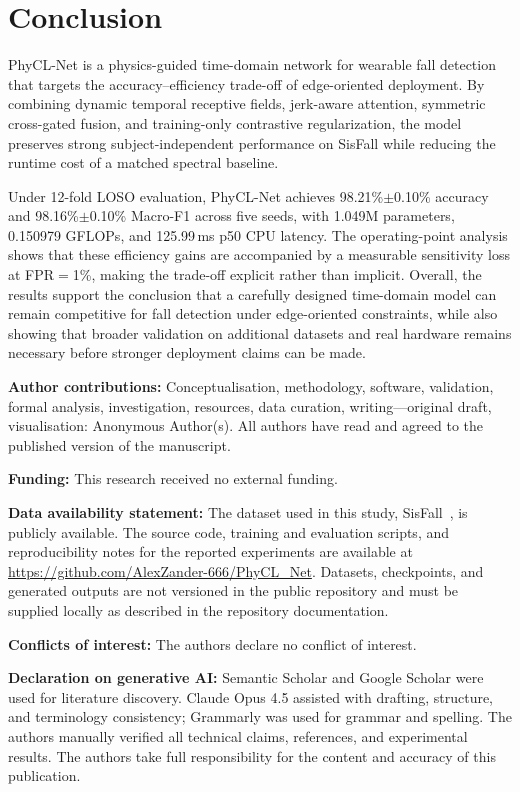 \documentclass[jec]{acnsart}
\begin{document}
\section{Conclusion}

PhyCL-Net is a physics-guided time-domain network for wearable fall detection that targets the accuracy--efficiency trade-off of edge-oriented deployment. By combining dynamic temporal receptive fields, jerk-aware attention, symmetric cross-gated fusion, and training-only contrastive regularization, the model preserves strong subject-independent performance on SisFall while reducing the runtime cost of a matched spectral baseline.

Under 12-fold LOSO evaluation, PhyCL-Net achieves 98.21\%$\pm$0.10\% accuracy and 98.16\%$\pm$0.10\% Macro-F1 across five seeds, with 1.049M parameters, 0.150979 GFLOPs, and 125.99\,ms p50 CPU latency. The operating-point analysis shows that these efficiency gains are accompanied by a measurable sensitivity loss at FPR${=}$1\%, making the trade-off explicit rather than implicit. Overall, the results support the conclusion that a carefully designed time-domain model can remain competitive for fall detection under edge-oriented constraints, while also showing that broader validation on additional datasets and real hardware remains necessary before stronger deployment claims can be made.

\vspace{1em}
\noindent\textbf{Author contributions:} Conceptualisation, methodology, software, validation, formal analysis, investigation, resources, data curation, writing---original draft, visualisation: Anonymous Author(s). All authors have read and agreed to the published version of the manuscript.

\vspace{0.5em}
\noindent\textbf{Funding:} This research received no external funding.

\vspace{0.5em}
\noindent\textbf{Data availability statement:} The dataset used in this study, SisFall~\cite{sucerquia2017sisfall}, is publicly available. The source code, training and evaluation scripts, and reproducibility notes for the reported experiments are available at \url{https://github.com/AlexZander-666/PhyCL_Net}. Datasets, checkpoints, and generated outputs are not versioned in the public repository and must be supplied locally as described in the repository documentation.

\vspace{0.5em}
\noindent\textbf{Conflicts of interest:} The authors declare no conflict of interest.

\vspace{0.5em}
\noindent\textbf{Declaration on generative AI:} Semantic Scholar and Google Scholar were used for literature discovery. Claude Opus 4.5 assisted with drafting, structure, and terminology consistency; Grammarly was used for grammar and spelling. The authors manually verified all technical claims, references, and experimental results. The authors take full responsibility for the content and accuracy of this publication.


\end{document}
